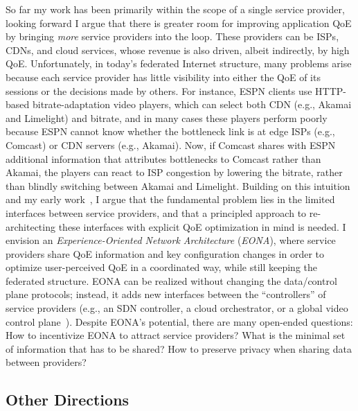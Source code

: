 So far my work has been primarily within the scope of a single service provider, looking forward I argue that there is greater room for improving application QoE by bringing {\em more} service providers into the loop. These providers can be ISPs, CDNs, and cloud services, whose revenue is also driven, albeit indirectly, by high QoE.
Unfortunately, in today's federated Internet structure, many problems arise because each service provider has little visibility into either the QoE of its sessions or the decisions made by others.
For instance, ESPN clients use HTTP-based bitrate-adaptation video players, which can select both CDN (e.g., Akamai and Limelight) and bitrate, and in many cases these players perform poorly because ESPN cannot know whether the bottleneck link is at edge ISPs (e.g., Comcast) or CDN servers (e.g., Akamai).
Now, if Comcast shares with ESPN additional information that attributes bottlenecks to Comcast rather than Akamai, the players can react to ISP congestion by lowering the bitrate, rather than blindly switching between Akamai and Limelight. 
Building on this intuition and my early work~\cite{eona}, I argue that the fundamental problem lies in the limited interfaces between service providers, and that a principled approach to re-architecting these interfaces with explicit QoE optimization in mind is needed.
I envision an {\em Experience-Oriented Network Architecture} ({\em EONA}), where service providers share QoE information and key configuration changes in order to optimize user-perceived QoE in a coordinated way, while still keeping the federated structure.
EONA can be realized without changing the data/control plane protocols; instead, it adds new interfaces between the ``controllers'' of service providers (e.g., an SDN controller, a cloud orchestrator, or a global video control plane~\cite{sigcomm12}).
Despite EONA's potential, there are many open-ended questions: 
How to incentivize EONA to attract service providers?
What is the minimal set of information that has to be shared? 
How to preserve privacy when sharing data between providers?

\subsection{Other Directions}

